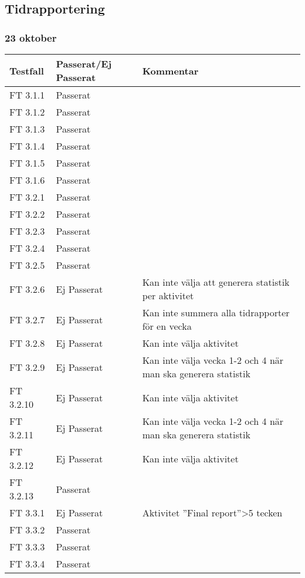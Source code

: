 \documentclass[a4paper]{article}
\begin{document}
\subsection{Tidrapportering}

\subsubsection{23 oktober}
\begin{tabular}{| l | l | p{9cm} |}
\hline
Testfall &  Passerat/Ej Passerat & Kommentar\\
\hline
FT 3.1.1 & Passerat & \\
\hline
FT 3.1.2 & Passerat & \\
\hline
FT 3.1.3 & Passerat & \\
\hline
FT 3.1.4 & Passerat & \\
\hline
FT 3.1.5 & Passerat & \\
\hline
FT 3.1.6 & Passerat & \\
\hline
FT 3.2.1 & Passerat & \\
\hline
FT 3.2.2 & Passerat & \\
\hline
FT 3.2.3 & Passerat & \\
\hline
FT 3.2.4 & Passerat & \\
\hline
FT 3.2.5 & Passerat & \\
\hline
FT 3.2.6 & Ej Passerat & Kan inte välja att generera statistik per aktivitet \\
\hline
FT 3.2.7 & Ej Passerat & Kan inte summera alla tidrapporter för en vecka \\
\hline
FT 3.2.8 & Ej Passerat &  Kan inte välja aktivitet \\
\hline
FT 3.2.9 & Ej Passerat &  Kan inte välja vecka 1-2 och 4 när man ska generera statistik\\
\hline
FT 3.2.10 & Ej Passerat & Kan inte välja aktivitet \\
\hline
FT 3.2.11 & Ej Passerat & Kan inte välja vecka 1-2 och 4 när man ska generera statistik \\
\hline
FT 3.2.12 & Ej Passerat & Kan inte välja aktivitet \\
\hline
FT 3.2.13 & Passerat & \\
\hline
FT 3.3.1 & Ej Passerat & Aktivitet ”Final report”>5 tecken \\
\hline
FT 3.3.2 & Passerat & \\
\hline
FT 3.3.3 & Passerat & \\
\hline
FT 3.3.4 & Passerat & \\

\end{tabular}
\end{document}
